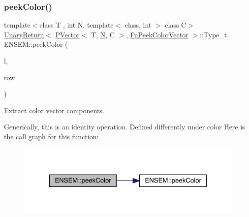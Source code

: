 \mbox{\label{group__primvector_ga69a1dd204a81451dda8a8a886a17b5c9}} 
\subsubsection{\texorpdfstring{peekColor()}{peekColor()}\hspace{0.1cm}{\footnotesize\ttfamily [1/2]}}
{\footnotesize\ttfamily template$<$class T , int N, template$<$ class, int $>$ class C$>$ \\
\mbox{\hyperlink{structENSEM_1_1UnaryReturn}{Unary\+Return}}$<$ \mbox{\hyperlink{classENSEM_1_1PVector}{P\+Vector}}$<$ T, \mbox{\hyperlink{operator__name__util_8cc_a7722c8ecbb62d99aee7ce68b1752f337}{N}}, C $>$, \mbox{\hyperlink{structENSEM_1_1FnPeekColorVector}{Fn\+Peek\+Color\+Vector}} $>$\+::Type\+\_\+t E\+N\+S\+E\+M\+::peek\+Color (\begin{DoxyParamCaption}\item[{const \mbox{\hyperlink{classENSEM_1_1PVector}{P\+Vector}}$<$ T, \mbox{\hyperlink{operator__name__util_8cc_a7722c8ecbb62d99aee7ce68b1752f337}{N}}, C $>$ \&}]{l,  }\item[{int}]{row }\end{DoxyParamCaption})\hspace{0.3cm}{\ttfamily [inline]}}



Extract color vector components. 

Generically, this is an identity operation. Defined differently under color Here is the call graph for this function\+:\nopagebreak
\begin{figure}[H]
\begin{center}
\leavevmode
\includegraphics[width=321pt]{d3/dc4/group__primvector_ga69a1dd204a81451dda8a8a886a17b5c9_cgraph}
\end{center}
\end{figure}
\mbox{\label{group__primvector_gaa5bcf955bf475e0717ffc91e91c154b9}} 
